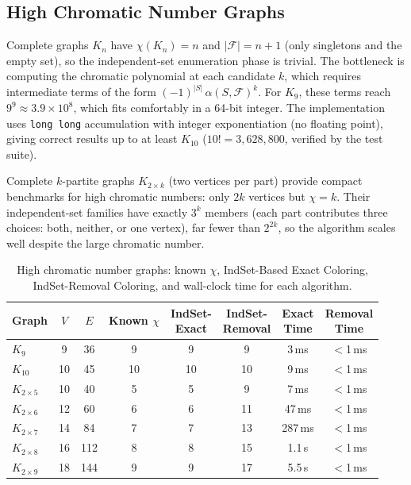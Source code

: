 \documentclass[11pt]{article}
\begin{document}
\subsection{High Chromatic Number Graphs}

Complete graphs $K_n$ have $\chi(K_n) = n$ and $|\mathcal{F}| = n+1$ (only
singletons and the empty set), so the independent-set enumeration phase is
trivial.  The bottleneck is computing the chromatic polynomial at each candidate
$k$, which requires intermediate terms of the form
$(-1)^{|S|}\,\alpha(S,\mathcal{F})^k$.  For $K_9$, these terms reach
$9^9 \approx 3.9 \times 10^8$, which fits comfortably in a 64-bit integer.
The implementation uses \texttt{long long} accumulation with integer
exponentiation (no floating point), giving correct results up to at least
$K_{10}$ ($10! = 3{,}628{,}800$, verified by the test suite).

Complete $k$-partite graphs $K_{2 \times k}$ (two vertices per part) provide
compact benchmarks for high chromatic numbers: only $2k$ vertices but $\chi = k$.
Their independent-set families have exactly $3^k$ members (each part contributes
three choices: both, neither, or one vertex), far fewer than $2^{2k}$, so the
algorithm scales well despite the large chromatic number.

\begin{table}[h]
\centering
\caption{High chromatic number graphs: known $\chi$, IndSet-Based Exact Coloring,
  IndSet-Removal Coloring, and wall-clock time for each algorithm.}
\label{tab:highchi}
\begin{tabular}{lccccccc}
\toprule
Graph & $V$ & $E$ & \makecell{Known\\$\chi$} & \makecell{IndSet-\\Exact} & \makecell{IndSet-\\Removal} & \makecell{Exact\\Time} & \makecell{Removal\\Time} \\
\midrule
$K_9$          & 9  & 36  & 9  & 9  & 9  &    3\,ms & $<$1\,ms \\
$K_{10}$       & 10 & 45  & 10 & 10 & 10 &    9\,ms & $<$1\,ms \\
$K_{2\times5}$ & 10 & 40  & 5  & 5  & 9  &    7\,ms & $<$1\,ms \\
$K_{2\times6}$ & 12 & 60  & 6  & 6  & 11 &   47\,ms & $<$1\,ms \\
$K_{2\times7}$ & 14 & 84  & 7  & 7  & 13 &  287\,ms & $<$1\,ms \\
$K_{2\times8}$ & 16 & 112 & 8  & 8  & 15 &  1.1\,s  & $<$1\,ms \\
$K_{2\times9}$ & 18 & 144 & 9  & 9  & 17 &  5.5\,s  & $<$1\,ms \\
\bottomrule
\end{tabular}
\end{table}
\end{document}
